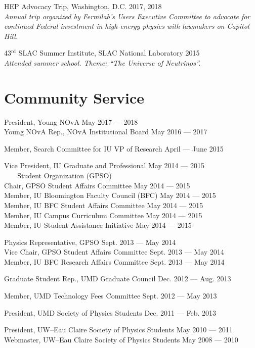 \documentclass[11pt]{cv}
\begin{document}
\begin{cv}
HEP Advocacy Trip, Washington, D.C. \hfill 2017, 2018 \\
\emph{Annual trip organized by Fermilab's Users Executive Committee to advocate for continued Federal investment in high-energy physics with lawmakers on Capitol Hill.}

43$^{\text{rd}}$ SLAC Summer Institute, SLAC National Laboratory \hfill 2015 \\
\emph{Attended summer school. Theme: ``The Universe of Neutrinos''.}


\section{Community Service}

President, Young NOvA \hfill May 2017 --- 2018 \\
Young NOvA Rep., NOvA Institutional Board \hfill May 2016 --- 2017

Member, Search Committee for IU VP of Research \hfill April --- June 2015

Vice President, IU Graduate and Professional \hfill May 2014 --- 2015 \\
\verb!   ! Student Organization (GPSO) \\
Chair, GPSO Student Affairs Committee \hfill May 2014 --- 2015 \\
Member, IU Bloomington Faculty Council (BFC) \hfill May 2014 --- 2015 \\
Member, IU BFC Student Affairs Committee \hfill May 2014 --- 2015 \\
Member, IU Campus Curriculum Committee \hfill May 2014 --- 2015 \\
Member, IU Student Assistance Initiative \hfill May 2014 --- 2015

Physics Representative, GPSO \hfill Sept. 2013 --- May 2014 \\
Vice Chair, GPSO Student Affairs Committee \hfill Sept. 2013 --- May 2014 \\
Member, IU BFC Research Affairs Committee \hfill Sept. 2013 --- May 2014

Graduate Student Rep., UMD Graduate Council \hfill Dec. 2012 --- Aug. 2013

Member, UMD Technology Fees Committee \hfill Sept. 2012 --- May 2013

President, UMD Society of Physics Students \hfill Dec. 2011 --- Feb. 2013

President, UW--Eau Claire Society of Physics Students \hfill May 2010 --- 2011 \\
Webmaster, UW--Eau Claire Society of Physics Students \hfill May 2008 --- 2010


\end{cv}
\end{document}
